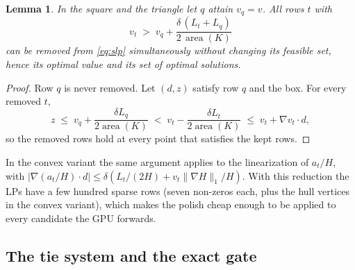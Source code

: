 \documentclass[11pt]{article}
\newtheorem{lemma}{Lemma}
\theoremstyle{remark}
\newcommand{\area}{\operatorname{area}}
\begin{document}
\begin{lemma}\label{lem:reduce}
In the square and the triangle let $q$ attain $v_q = v$. All rows $t$ with
\[
  v_t \;>\; v_q + \frac{\delta\,(L_t + L_q)}{2\,\area(K)}
\]
can be removed from \eqref{eq:slp} simultaneously without changing its feasible set, hence its optimal value and its set
of optimal solutions.
\end{lemma}

\begin{proof}
Row $q$ is never removed. Let $(d,z)$ satisfy row $q$ and the box. For every removed $t$,
\[
  z \;\le\; v_q + \frac{\delta L_q}{2\area(K)} \;<\; v_t - \frac{\delta L_t}{2\area(K)} \;\le\; v_t + \nabla v_t \cdot d,
\]
so the removed rows hold at every point that satisfies the kept rows.
\end{proof}

In the convex variant the same argument applies to the linearization of $a_t / H$, with
$|\nabla (a_t/H) \cdot d| \le \delta (L_t / (2H) + v_t \|\nabla H\|_1 / H)$. With this reduction the LPs have a few
hundred sparse rows (seven non-zeros each, plus the hull vertices in the convex variant), which makes the polish cheap
enough to be applied to every candidate the GPU forwards.

\subsection{The tie system and the exact gate}\label{sec:tie}
\end{document}
